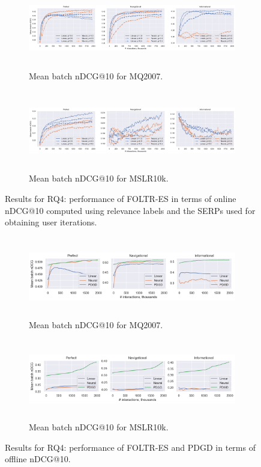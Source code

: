 \begin{figure}[t]
	\centering
	\begin{subfigure}{1\textwidth}
		\includegraphics[width=15cm, height=3.5cm]{images/RQ3n4/mq2007_foltr_DCG_both_c2000_ps.png}
		\caption{Mean batch nDCG@10 for MQ2007.}
		\label{fig:mq2007-rq4}
	\end{subfigure}
	\begin{subfigure}{1\textwidth}
		\includegraphics[width=15cm, height=3.5cm]{images/RQ3n4/mslr10k_foltr_DCG_both_c2000_ps.png}
		\caption{Mean batch nDCG@10 for MSLR10k.}
		\label{fig:mslr10k-rq4}
	\end{subfigure}
	\caption{Results for RQ4: performance of FOLTR-ES in terms of online nDCG@10 computed using relevance labels and the SERPs used for obtaining user iterations. \label{fig:RQ4}} 
\end{figure}

\begin{figure}[t]
	\centering
	\begin{subfigure}{1\textwidth}
		\includegraphics[width=15cm, height=3.5cm]{images/RQ3n4/mq2007_foltr_PDGD_offline_ndcg_c2000_p1.0.png}
		\caption{Mean batch nDCG@10 for MQ2007.}
		\label{fig:mq2007-rq4-offline}
	\end{subfigure}
	\begin{subfigure}{1\textwidth}
		\includegraphics[width=15cm, height=3.5cm]{images/RQ3n4/mslr10k_foltr_PDGD_offline_ndcg_c2000_p1.0.png}
		\caption{Mean batch nDCG@10 for MSLR10k.}
		\label{fig:mslr10k-rq4-offline}
	\end{subfigure}
	\caption{Results for RQ4: performance of FOLTR-ES and PDGD in terms of offline nDCG@10. \label{fig:RQ4-offline}} 
\end{figure}

